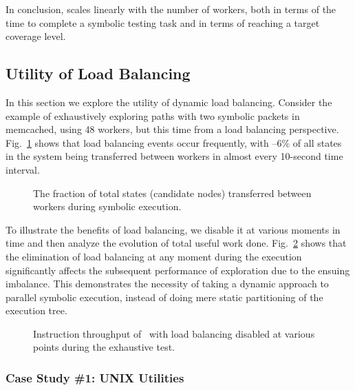In conclusion, \cnine scales linearly with the number of workers, both in terms of the time to complete a symbolic testing task and in terms of reaching a target coverage level.  %


\iffalse
\subsection{Utility of Load Balancing}
\label{sec:profiling}
 
In this section we explore the utility of dynamic load balancing.  Consider the example of exhaustively exploring paths with two symbolic packets in memcached, using 48 workers, but this time from a load balancing perspective. Fig.~\ref{fig:scalab-load-balancing} shows that load balancing events occur frequently, with --6\% of all states in the system being transferred between workers in almost every 10-second time interval.

\begin{figure}[h!]
  \centering
  \caption{The fraction of total states (candidate nodes) transferred between workers during symbolic execution.}
  \label{fig:scalab-load-balancing}
\end{figure} 

To illustrate the benefits of load balancing, we disable it at various moments in time and then analyze the evolution of total useful work done. Fig.~\ref{fig:scalab-static-balancing} shows that the elimination of load balancing at any moment during the execution significantly affects the subsequent performance of exploration due to the ensuing imbalance.  This demonstrates the necessity of taking a dynamic approach to parallel symbolic execution, instead of doing mere static partitioning of the execution tree.

\begin{figure}[h!]
  \centering
  \caption{Instruction throughput of \cnine\ with load balancing disabled at various points during the exhaustive test.}
  \label{fig:scalab-static-balancing}
  \vspace{-0.5cm}
\end{figure}

\subsubsection{Case Study \#1: UNIX Utilities}
\label{sec:coreutils}

